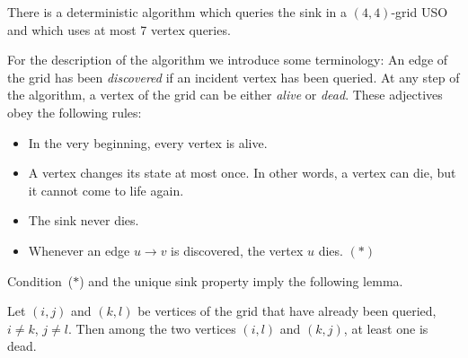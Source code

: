 \documentclass[runningheads,a4paper]{llncs}
\begin{document}
\begin{proposition}
    \label{prop:4:7}
    There is a deterministic algorithm which queries the sink in a
    $(4,4)$-grid USO and which uses at most 7 vertex queries.
\end{proposition}

For the description of the algorithm we introduce some terminology:
An edge of the grid has been \emph{discovered} if an incident vertex has been
queried.
At any step of the algorithm, a vertex of the grid can be either \emph{alive}
or \emph{dead}.
These adjectives obey the following rules:
\begin{itemize}
    \item
        In the very beginning, every vertex is alive.

    \item
        A vertex changes its state at most once.
        In other words, a vertex can die, but it cannot come to life again.

    \item
        The sink never dies.

    \item
        Whenever an edge $u \to v$ is discovered, the vertex $u$ dies.
        \hfill $(*)$
\end{itemize}

Condition~($*$) and the unique sink property imply the following lemma.

\begin{lemma}
    Let $(i,j)$ and $(k,l)$ be vertices of the grid that have already been
    queried, $i \neq k$, $j \neq l$.
    Then among the two vertices $(i,l)$ and $(k,j)$, at least one is dead.

    \label{lem:rectangle}
\end{lemma}
\end{document}
